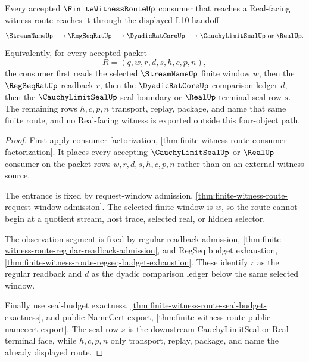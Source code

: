 \begin{theorem}
\label{thm:finite-witness-route-l10-terminal-four-object-handoff}
Every accepted $\FiniteWitnessRouteUp$ consumer that reaches a Real-facing witness route reaches it through the displayed L10 handoff
$$
\StreamNameUp \longrightarrow \RegSeqRatUp \longrightarrow \DyadicRatCoreUp \longrightarrow \CauchyLimitSealUp \text{ or } \RealUp .
$$
Equivalently, for every accepted packet
$$
R=(q,w,r,d,s,h,c,p,n),
$$
the consumer first reads the selected $\StreamNameUp$ finite window $w$, then the $\RegSeqRatUp$ readback $r$, then the $\DyadicRatCoreUp$ comparison ledger $d$, then the $\CauchyLimitSealUp$ seal boundary or $\RealUp$ terminal seal row $s$. The remaining rows $h,c,p,n$ transport, replay, package, and name that same finite route, and no Real-facing witness is exported outside this four-object path.
\end{theorem}
\begin{proof}
First apply consumer factorization, \autoref{thm:finite-witness-route-consumer-factorization}. It places every accepting $\CauchyLimitSealUp$ or $\RealUp$ consumer on the packet rows $w,r,d,s,h,c,p,n$ rather than on an external witness source.

The entrance is fixed by request-window admission, \autoref{thm:finite-witness-route-request-window-admission}. The selected finite window is $w$, so the route cannot begin at a quotient stream, host trace, selected real, or hidden selector.

The observation segment is fixed by regular readback admission, \autoref{thm:finite-witness-route-regular-readback-admission}, and RegSeq budget exhaustion, \autoref{thm:finite-witness-route-regseq-budget-exhaustion}. These identify $r$ as the regular readback and $d$ as the dyadic comparison ledger below the same selected window.

Finally use seal-budget exactness, \autoref{thm:finite-witness-route-seal-budget-exactness}, and public NameCert export, \autoref{thm:finite-witness-route-public-namecert-export}. The seal row $s$ is the downstream CauchyLimitSeal or Real terminal face, while $h,c,p,n$ only transport, replay, package, and name the already displayed route.
\end{proof}

